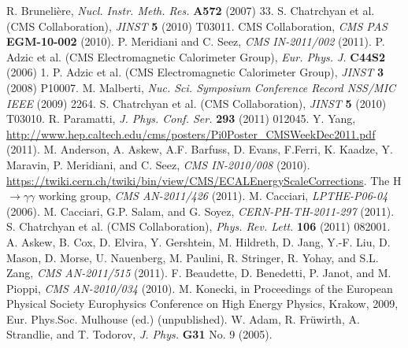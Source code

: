 \documentclass[12pt, letterpaper]{report}
\begin{document}
\begin{thebibliography}{99}

 R. Bruneli\`ere, \textit{Nucl. Instr. Meth. Res.} \textbf{A572} (2007) 33.
 S. Chatrchyan et al. (CMS Collaboration), \textit{JINST} \textbf{5} (2010) T03011.
 CMS Collaboration, \textit{CMS PAS} \textbf{EGM-10-002} (2010).
 P. Meridiani and C. Seez, \textit{CMS IN-2011/002} (2011).
 P. Adzic et al. (CMS Electromagnetic Calorimeter Group), \textit{Eur. Phys. J.} \textbf{C44S2} (2006) 1.
 P. Adzic et al. (CMS Electromagnetic Calorimeter Group), \textit{JINST} \textbf{3} (2008) P10007.
 M. Malberti, \textit{Nuc. Sci. Symposium Conference Record NSS/MIC IEEE} (2009) 2264.
 S. Chatrchyan et al. (CMS Collaboration), \textit{JINST} \textbf{5} (2010) T03010.
 R. Paramatti, \textit{J. Phys. Conf. Ser.} \textbf{293} (2011) 012045.
 Y. Yang, \url{http://www.hep.caltech.edu/cms/posters/Pi0Poster_CMSWeekDec2011.pdf} (2011).
 M. Anderson, A. Askew, A.F. Barfuss, D. Evans, F.Ferri, K. Kaadze, Y. 
Maravin, P. Meridiani, and C. Seez, \textit{CMS IN-2010/008} (2010).
 \url{https://twiki.cern.ch/twiki/bin/view/CMS/ECALEnergyScaleCorrections}.
 The H$\rightarrow\gamma\gamma$ working group, \textit{CMS AN-2011/426} (2011).
 M. Cacciari, \textit{LPTHE-P06-04} (2006).
 M. Cacciari, G.P. Salam, and G. Soyez, \textit{CERN-PH-TH-2011-297} (2011).
 S. Chatrchyan et al. (CMS Collaboration), \textit{Phys. Rev. Lett.} \textbf{106} (2011) 082001.
 A. Askew, B. Cox, D. Elvira, Y. Gershtein, M. Hildreth, D. Jang, Y.-F. Liu, D. Mason, D. Morse, U. Nauenberg, M. Paulini, R. Stringer, R. Yohay, and S.L. Zang, \textit{CMS AN-2011/515} (2011).
 F. Beaudette, D. Benedetti, P. Janot, and M. Pioppi, \textit{CMS AN-2010/034} (2010).
 M. Konecki, in Proceedings of the European Physical Society  Europhysics Conference on High Energy Physics, Krakow, 2009, Eur. Phys.Soc. Mulhouse (ed.) (unpublished).
 W. Adam, R. Fr\"uwirth, A. Strandlie, and T. Todorov, \textit{J. Phys.} \textbf{G31} No. 9 (2005).

\end{thebibliography}
\end{document}
